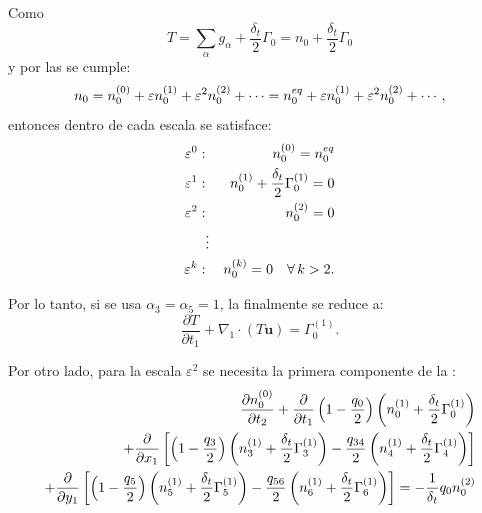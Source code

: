 Como
\begin{equation}
	T = \sum_{\alpha} g_{\alpha} + \dfrac{\delta_t}{2} \Gamma_0 = n_0 + \dfrac{\delta_t}{2} \Gamma_0
\end{equation}
y por las  se cumple:
\begin{equation}
	n_0 = n_{0}^{(0)} + \varepsilon n_{0}^{(1)} + \varepsilon^2 n_{0}^{(2)} + \cdots = n_0^{eq} + \varepsilon n_{0}^{(1)} + \varepsilon^2 n_{0}^{(2)} + \cdots,
\end{equation}
entonces dentro de cada escala se satisface:
\begin{equation}
	\begin{aligned}
		\varepsilon^0: && n_{0}^{(0)} = n_0^{eq} \\
		\varepsilon^1: && n_{0}^{(1)} + \dfrac{\delta_t}{2} \Gamma_0^{(1)} = 0\\
		\varepsilon^2: && n_{0}^{(2)} = 0 \\
		&\vdots& \\
		\varepsilon^k: && n_{0}^{(k)} = 0 \quad \forall \, k > 2.
	\end{aligned}
	\label{eq:ncero_che}
\end{equation}

Por lo tanto, si se usa $\alpha_3 = \alpha_5 = 1$, la  finalmente se reduce a:
\begin{equation}
	\dfrac{\partial T}{\partial t_1} + \nabla_1 \cdot (T\bm{u}) = \Gamma_0^{(1)}.
	\label{eq:T_eps_1_macro}
\end{equation}

Por otro lado, para la escala $\varepsilon^2$ se necesita la primera componente de la :
\begin{equation}
	\begin{split}
	\dfrac{\partial n_{0}^{(0)}}{\partial t_2} + \dfrac{\partial}{\partial t_1}\left( 1-\dfrac{q_0}{2} \right) \left( n_{0}^{(1)} +\dfrac{\delta_t}{2} \Gamma_0^{(1)}\right) \\
	+ \dfrac{\partial}{\partial x_1}\left[ \left( 1-\dfrac{q_3}{2} \right) \left( n_{3}^{(1)} +\dfrac{\delta_t}{2} \Gamma_3^{(1)}\right) - \dfrac{q_{34}}{2} \left( n_{4}^{(1)} +\dfrac{\delta_t}{2} \Gamma_4^{(1)}\right) \right] \\
	+ \dfrac{\partial}{\partial y_1}\left[ \left( 1-\dfrac{q_5}{2} \right) \left( n_{5}^{(1)} +\dfrac{\delta_t}{2} \Gamma_5^{(1)}\right) - \dfrac{q_{56}}{2} \left( n_{6}^{(1)} +\dfrac{\delta_t}{2} \Gamma_6^{(1)}\right) \right] = -\dfrac{1}{\delta_t} q_0 n_{0}^{(2)}
	\end{split}
	\label{eq:eps_2_comp_0}
\end{equation}

